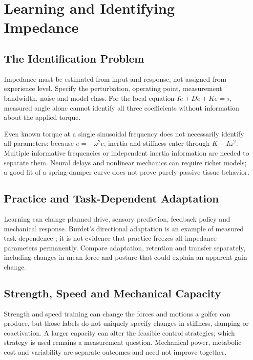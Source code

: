 \section{Learning and Identifying Impedance}
\label{sec:training}

\subsection{The Identification Problem}
\label{subsec:pre_training}

Impedance must be estimated from input and response, not assigned from experience level. Specify the perturbation, operating point, measurement bandwidth, noise and model class. For the local equation $I\ddot e+D\dot e+Ke=\tau$, measured angle alone cannot identify all three coefficients without information about the applied torque.

Even known torque at a single sinusoidal frequency does not necessarily identify all parameters: because $\ddot e=-\omega^2e$, inertia and stiffness enter through $K-I\omega^2$. Multiple informative frequencies or independent inertia information are needed to separate them. Neural delays and nonlinear mechanics can require richer models; a good fit of a spring-damper curve does not prove purely passive tissue behavior.

\subsection{Practice and Task-Dependent Adaptation}
\label{subsec:practice_impedance}

Learning can change planned drive, sensory prediction, feedback policy and mechanical response. Burdet's directional adaptation is an example of measured task dependence \citep{Burdet2001Impedance}; it is not evidence that practice freezes all impedance parameters permanently. Compare adaptation, retention and transfer separately, including changes in mean force and posture that could explain an apparent gain change.

\subsection{Strength, Speed and Mechanical Capacity}
\label{subsec:strength_speed}

Strength and speed training can change the forces and motions a golfer can produce, but those labels do not uniquely specify changes in stiffness, damping or coactivation. A larger capacity can alter the feasible control strategies; which strategy is used remains a measurement question. Mechanical power, metabolic cost and variability are separate outcomes and need not improve together.

